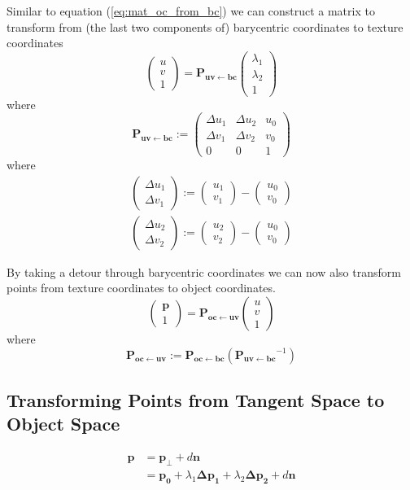 \documentclass{article}
\newcommand{\vctr}[1]{\mathbf{#1}}
\newcommand{\point}[1]{\mathbf{#1}}
\newcommand{\mat}[1]{\mathbf{#1}}
\newcommand{\pMat}[2]{\mat{P_{#1 \leftarrow #2}}}
\newcommand{\colvec}[1]{\begin{pmatrix}#1\end{pmatrix}}
\begin{document}
Similar to equation (\ref{eq:mat_oc_from_bc}) we can construct a matrix to transform from (the last two components of) barycentric coordinates to texture coordinates
\[
 \colvec{u \\ v \\1} = \pMat{uv}{bc} \colvec{\lambda_1 \\ \lambda_2 \\ 1}
\]
where
\begin{equation}
 \pMat{uv}{bc} := \begin{pmatrix} 
                  \Delta u_1 & \Delta u_2 & u_0 \\
                  \Delta v_1 & \Delta v_2 & v_0 \\
                  0 & 0 & 1
                 \end{pmatrix}
\end{equation}
where
\begin{align*}
 \colvec{\Delta u_1 \\ \Delta v_1} := \colvec{u_1 \\ v_1} - \colvec{u_0 \\ v_0}\\
 \colvec{\Delta u_2 \\ \Delta v_2} := \colvec{u_2 \\ v_2} - \colvec{u_0 \\ v_0}
\end{align*}

By taking a detour through barycentric coordinates we can now also transform points from texture coordinates to object coordinates.
\begin{equation*}
\colvec{\point{p}\\1} = \pMat{oc}{uv} \colvec{u \\ v \\1} 
\end{equation*}
where
\begin{equation*}
 \pMat{oc}{uv} := \pMat{oc}{bc}(\pMat{uv}{bc}^{-1}) 
\end{equation*}




\subsection{Transforming Points from Tangent Space to Object Space}
\begin{align*}
 \point{p} &= \point{p_\perp} + d \vctr{n}\\
 &= \point{p_0} + \lambda_1 \point{\Delta p_1} + \lambda_2 \point{\Delta p_2} + d \vctr{n}
\end{align*}
\end{document}
